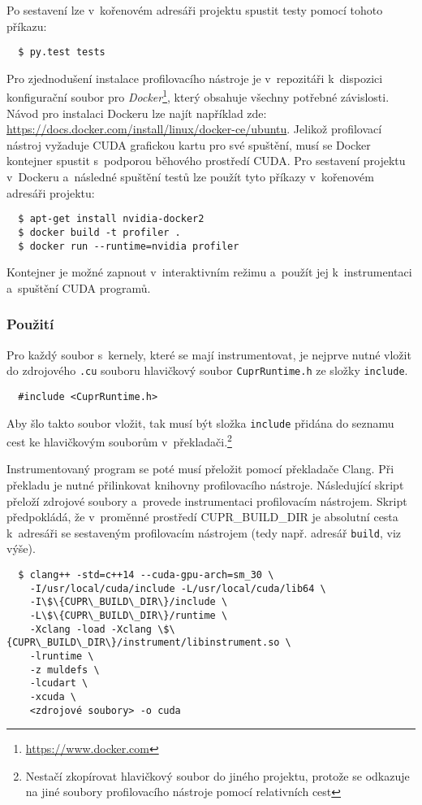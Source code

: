Po sestavení lze v~kořenovém adresáři projektu spustit testy pomocí tohoto příkazu:
\begin{verbatim}
  $ py.test tests
\end{verbatim}

Pro zjednodušení instalace profilovacího nástroje je v~repozitáři k~dispozici konfigurační soubor pro \emph{Docker}\footnote{\url{https://www.docker.com}}, který obsahuje všechny potřebné závislosti. Návod pro instalaci Dockeru lze najít například zde: \url{https://docs.docker.com/install/linux/docker-ce/ubuntu}.
Jelikož profilovací nástroj vyžaduje CUDA grafickou kartu pro své spuštění, musí se Docker kontejner spustit s~podporou běhového prostředí CUDA. Pro sestavení projektu v~Dockeru a~následné spuštění testů lze použít tyto příkazy v~kořenovém adresáři projektu:
\begin{verbatim}
  $ apt-get install nvidia-docker2
  $ docker build -t profiler .
  $ docker run --runtime=nvidia profiler
\end{verbatim}

Kontejner je možné zapnout v~interaktivním režimu a~použít jej k~instrumentaci a~spuštění CUDA programů.

\subsubsection{Použití}
\label{manual:usage}
Pro každý soubor s~kernely, které se mají instrumentovat, je nejprve nutné vložit do zdrojového \texttt{.cu} souboru hlavičkový soubor \texttt{CuprRuntime.h} ze složky \texttt{include}.
\begin{verbatim}
  #include <CuprRuntime.h>
\end{verbatim}
Aby šlo takto soubor vložit, tak musí být složka \texttt{include} přidána do seznamu cest ke hlavičkovým souborům v~překladači.\footnote{Nestačí zkopírovat hlavičkový soubor do jiného projektu, protože se odkazuje na jiné soubory profilovacího nástroje pomocí relativních cest}

Instrumentovaný program se poté musí přeložit pomocí překladače Clang. Při překladu je nutné přilinkovat knihovny profilovacího nástroje. Následující skript přeloží zdrojové soubory a~provede instrumentaci profilovacím nástrojem. Skript předpokládá, že v~proměnné prostředí CUPR\_BUILD\_DIR je absolutní cesta k~adresáři se sestaveným profilovacím nástrojem (tedy např. adresář \texttt{build}, viz výše).

\noindent
\begin{minipage}{\textwidth}
\begin{verbatim}
  $ clang++ -std=c++14 --cuda-gpu-arch=sm_30 \
	-I/usr/local/cuda/include -L/usr/local/cuda/lib64 \
	-I\$\{CUPR\_BUILD\_DIR\}/include \
	-L\$\{CUPR\_BUILD\_DIR\}/runtime \
	-Xclang -load -Xclang \$\{CUPR\_BUILD\_DIR\}/instrument/libinstrument.so \
	-lruntime \
	-z muldefs \
	-lcudart \
	-xcuda \
	<zdrojové soubory> -o cuda
\end{verbatim}
\end{minipage}


